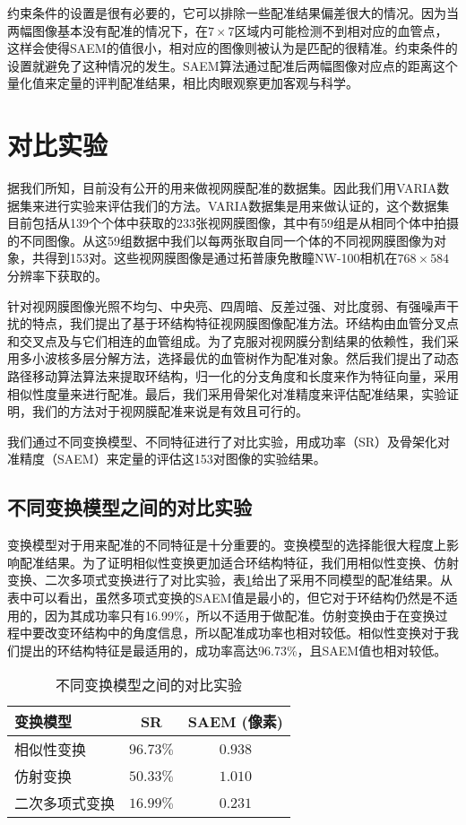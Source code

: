 约束条件的设置是很有必要的，它可以排除一些配准结果偏差很大的情况。因为当两幅图像基本没有配准的情况下，在$7 \times 7$区域内可能检测不到相对应的血管点，这样会使得SAEM的值很小，相对应的图像则被认为是匹配的很精准。约束条件的设置就避免了这种情况的发生。SAEM算法通过配准后两幅图像对应点的距离这个量化值来定量的评判配准结果，相比肉眼观察更加客观与科学。
\section{对比实验}
\label{}
据我们所知，目前没有公开的用来做视网膜配准的数据集。因此我们用VARIA数据集\cite{ortega2009retinal,ortega2009personal}来进行实验来评估我们的方法。VARIA数据集是用来做认证的，这个数据集目前包括从139个个体中获取的233张视网膜图像，其中有59组是从相同个体中拍摄的不同图像。从这59组数据中我们以每两张取自同一个体的不同视网膜图像为对象，共得到153对。这些视网膜图像是通过拓普康免散瞳NW-100相机在$768 \times 584$分辨率下获取的。

针对视网膜图像光照不均匀、中央亮、四周暗、反差过强、对比度弱、有强噪声干扰的特点，我们提出了基于环结构特征视网膜图像配准方法。环结构由血管分叉点和交叉点及与它们相连的血管组成。为了克服对视网膜分割结果的依赖性，我们采用多小波核多层分解方法，选择最优的血管树作为配准对象。然后我们提出了动态路径移动算法算法来提取环结构，归一化的分支角度和长度来作为特征向量，采用相似性度量来进行配准。最后，我们采用骨架化对准精度来评估配准结果，实验证明，我们的方法对于视网膜配准来说是有效且可行的。

我们通过不同变换模型、不同特征进行了对比实验，用成功率（SR）及骨架化对准精度（SAEM）来定量的评估这153对图像的实验结果。

\subsection{不同变换模型之间的对比实验}

变换模型对于用来配准的不同特征是十分重要的。变换模型的选择能很大程度上影响配准结果。为了证明相似性变换更加适合环结构特征，我们用相似性变换、仿射变换、二次多项式变换进行了对比实验，表\ref{tab:models}给出了采用不同模型的配准结果。从表中可以看出，虽然多项式变换的SAEM值是最小的，但它对于环结构仍然是不适用的，因为其成功率只有16.99\%，所以不适用于做配准。仿射变换由于在变换过程中要改变环结构中的角度信息，所以配准成功率也相对较低。相似性变换对于我们提出的环结构特征是最适用的，成功率高达96.73\%，且SAEM值也相对较低。
\begin{table}
\caption{不同变换模型之间的对比实验}
\centering
\begin{tabular}{lcc}
\toprule
变换模型 & SR  & SAEM (像素)\\
\midrule
相似性变换 & $\mathbf{96.73\%}$ & $\mathbf{0.938}$ \\
仿射变换 & $50.33\%$ & $1.010$              \\
二次多项式变换 & $16.99\%$ & $0.231$\\
\bottomrule
\end{tabular}
\label{tab:models}
\end{table}

